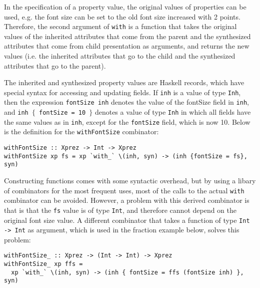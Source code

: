 \par  In the specification of a property value, the original values of
        properties can be used, e.g. the font size can be set to the old font size
        increased with 2 points. Therefore, the second argument of \texttt{with}
        is a function that takes the original values of the inherited attributes that
        come from the parent and the synthesized attributes that come from child
        presentation as arguments, and returns the new values (i.e. the inherited
        attributes that go to the child and the synthesized attributes that go to the
        parent).
\par  The inherited and synthesized property values are Haskell records,
        which have special syntax for accessing and updating fields. If \texttt{inh} is
        a value of type \texttt{Inh}, then the expression \texttt{fontSize inh} denotes
        the value of the fontSize field in \texttt{inh}, and \texttt{inh $\{$ fontSize =
        10 $\}$} denotes a value of type \texttt{Inh} in which all fields have the
        same values as in \texttt{inh}, except for the \texttt{fontSize} field, which
        is now 10. Below is the definition for the \texttt{withFontSize} combinator:
        \begin{small}\begin{verbatim}withFontSize :: Xprez -> Int -> Xprez
withFontSize xp fs = xp `with_` \(inh, syn) -> (inh {fontSize = fs}, syn)\end{verbatim}\end{small}

\par Constructing functions comes with some syntactic overhead, but by
        using a libary of combinators for the most frequent uses, most of the calls to
        the actual \texttt{with} combinator can be avoided. However, a problem
        with this derived combinator is that is that the \texttt{fs} value is of type
        \texttt{Int}, and therefore cannot depend on the original font size value. A
        different combinator that takes a function of type \texttt{Int -> Int} as
        argument, which is used in the fraction example below, solves this problem:\begin{small}\begin{verbatim}withFontSize_ :: Xprez -> (Int -> Int) -> Xprez
withFontSize_ xp ffs = 
  xp `with_` \(inh, syn) -> (inh { fontSize = ffs (fontSize inh) }, syn)\end{verbatim}\end{small}

